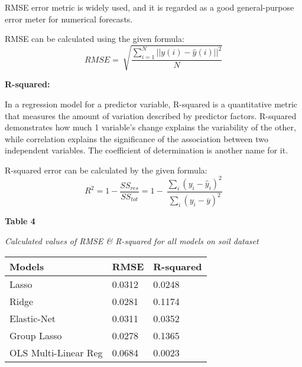 \documentclass{article} %
\begin{document}
\noindent RMSE error metric is widely used, and it is regarded as a good general-purpose error meter for numerical forecasts.

\noindent RMSE can be calculated using the given formula:
\begin{equation} \label{GrindEQ__19_} 
RMSE=\ \sqrt{\frac{\sum^N_{i=1}{{||y\left(i\right)-\hat{y}(i)||}^2}}{N}} 
\end{equation} 
\textbf{}

\noindent \textbf{}

\noindent \textbf{R-squared:}

\noindent In a regression model for a predictor variable, R-squared is a quantitative metric that measures the amount of variation described by predictor factors. R-squared demonstrates how much 1 variable's change explains the variability of the other, while correlation explains the significance of the association between two independent variables. The coefficient of determination is another name for it.

\noindent R-squared error can be calculated by the given formula:
\begin{equation} \label{GrindEQ__20_} 
R^2=1-\frac{{SS}_{res}}{{SS}_{tot}}=1-\ \frac{{\sum_i{(y_i-{\hat{y}}_i)}}^2}{{\sum_i{(y_i-\overline{y})}}^2} 
\end{equation} 


\noindent \textbf{Table 4}

\noindent \textit{Calculated values of RMSE \& R-squared for all models on soil dataset}

\begin{tabular}{|p{1.3in}|p{1.3in}|p{1.3in}|} \hline 
\textbf{Models} & \textbf{RMSE} & \textbf{R-squared} \\ \hline 
Lasso & 0.0312 & 0.0248 \\ \hline 
Ridge & 0.0281 & 0.1174 \\ \hline 
Elastic-Net & 0.0311 & 0.0352 \\ \hline 
Group Lasso & 0.0278 & 0.1365 \\ \hline 
OLS Multi-Linear Reg & 0.0684 & 0.0023 \\ \hline 
\end{tabular}
\end{document}
